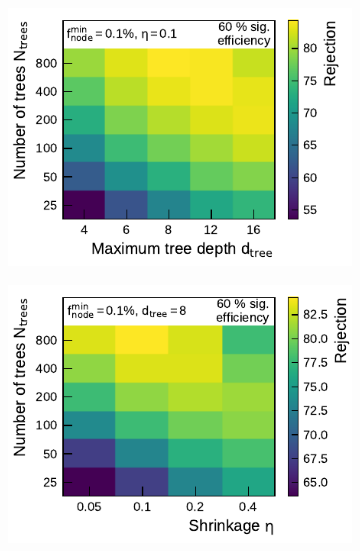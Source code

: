 \begin{figure}[htb]
  \begin{subfigure}[t]{0.48\textwidth}
    \centering
    \includegraphics{./figures/bdt_perf/gridsearch_1p/scan_MaxDepth_NTrees.pdf}
    \vspace*{-1.6em}
    \subcaption{}
    \label{fig:gridscan_maxdepth_ntrees}
  \end{subfigure}\hfill
  \begin{subfigure}[t]{0.48\textwidth}
    \centering
    \includegraphics{./figures/bdt_perf/gridsearch_1p/scan_Shrinkage_NTrees.pdf}
    \vspace*{-1.6em}
    \subcaption{}
    \label{fig:gridscan_shrinkage_ntrees}
  \end{subfigure}
  \begin{subfigure}[t]{0.48\textwidth}
    \centering

\end{subfigure}
\end{figure}
